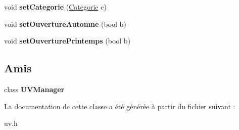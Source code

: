 \begin{DoxyCompactItemize}
\item 
\hypertarget{class_u_v_a8bf3d3307d4e7f7f5284085d1bc07262}{void {\bfseries set\+Categorie} (\hyperlink{class_categorie}{Categorie} c)}\label{class_u_v_a8bf3d3307d4e7f7f5284085d1bc07262}

\item 
\hypertarget{class_u_v_a7e670e649febebe0fe70c3ce79f4be63}{void {\bfseries set\+Ouverture\+Automne} (bool b)}\label{class_u_v_a7e670e649febebe0fe70c3ce79f4be63}

\item 
\hypertarget{class_u_v_a0ae246826809cc48a1999ec0671c78b3}{void {\bfseries set\+Ouverture\+Printemps} (bool b)}\label{class_u_v_a0ae246826809cc48a1999ec0671c78b3}

\end{DoxyCompactItemize}
\subsection*{Amis}
\begin{DoxyCompactItemize}
\item 
\hypertarget{class_u_v_a335ec2026467669b89518b0c67372f3b}{class {\bfseries U\+V\+Manager}}\label{class_u_v_a335ec2026467669b89518b0c67372f3b}

\end{DoxyCompactItemize}


La documentation de cette classe a été générée à partir du fichier suivant \+:\begin{DoxyCompactItemize}
\item 
uv.\+h\end{DoxyCompactItemize}
